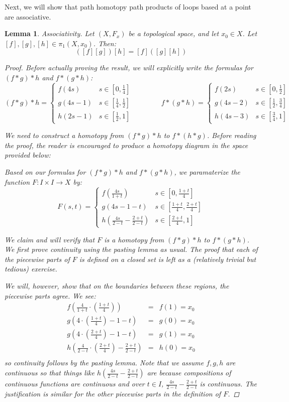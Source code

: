 \documentclass[reqno]{amsart}
\newtheorem{lemma}[theorem]{Lemma}
\begin{document}
Next, we will show that path homotopy path products of loops based at a point are associative. 
\begin{lemma} Associativity. Let $(X,F_x)$ be a topological space, and let $x_0\in X$. Let $[f],[g],[h]\in \pi_1(X,x_0)$. Then:
\[ ([f][g])[h] = [f]([g][h])\]

\begin{proof}
Before actually proving the result, we will explicitly write the formulas for $(f*g)*h$ and $f*(g*h)$:
\[(f*g)*h = \begin{cases}f(4s) & s\in [0,\frac14] \\ g(4s-1) & s\in[\frac14,\frac12] \\ h(2s-1) & s\in [\frac12,1] \end{cases} \qquad\qquad
f*(g*h) = \begin{cases}f(2s) & s\in [0,\frac12] \\ g(4s-2) & s\in[\frac12,\frac34] \\ h(4s-3) & s\in [\frac34,1] \end{cases}\]

We need to construct a homotopy from $(f*g)*h$ to $f*(h*g)$.
Before reading the proof, the reader is encouraged to produce a homotopy diagram in the space provided below:
\vspace{2.5in}

Based on our formulas for $(f*g)*h$ and $f*(g*h)$, we paramaterize the function $F:I\times I \to X$ by:
\[F(s,t) = \begin{cases} f\left(\frac{4s}{1+t}  \right)& s \in \left[ 0,\frac{1+t}4 \right] \\
g(4s-1-t) & s\in \left[\frac{1+t}4, \frac{2+t}4\right]  \\ 
h\left(\frac{4s}{2-t} - \frac{2+t}{2-t} \right) & s\in \left[\frac{2+t}4,1\right]\end{cases}\]

We claim and will verify that $F$ is a homotopy from $(f*g)*h$ to $f*(g*h)$. We first prove continuity using the pasting lemma as usual. 
The proof that each of the piecewise parts of $F$ is defined on a closed set is left as a (relatively trivial but tedious) exercise.

We will, however, show that on the boundaries between these regions, the piecewise parts agree. We see:
\begin{eqnarray*}
f\left(\frac{4}{1+t} \cdot \left(\frac{1+t}4\right)\right) & = &  f(1)  =  x_0 \\
g\left(4\cdot\left(\frac{1+t}4\right)-1-t\right) & = & g(0)  =  x_0\\
g\left(4\cdot\left(\frac{2+t}4\right)-1-t\right) & = & g(1)  =  x_0\\
h\left(\frac{4}{2-t} \cdot \left(\frac{2+t}4\right)- \frac{2+t}{2-t}\right) & = & h(0)  =  x_0\\
\end{eqnarray*}
so continuity follows by the pasting lemma. Note that we assume $f,g,h$ are continuous so that things like $h\left(\frac{4s}{2-t} - \frac{2+t}{2-t} \right)$ are because compositions of continuous functions are continuous and over $t\in I$, $\frac{4s}{2-t} - \frac{2+t}{2-t}$ is continuous. The justification is similar for the other piecewise parts in the definition of $F$. 


\end{proof}
\end{lemma}
\end{document}
